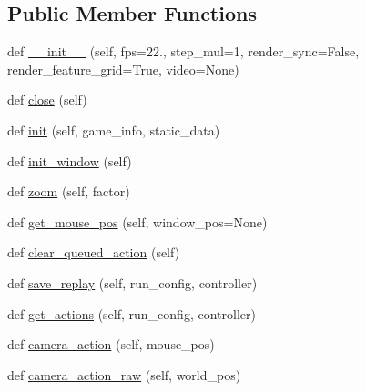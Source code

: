 \subsection*{Public Member Functions}
\begin{DoxyCompactItemize}
\item 
def \mbox{\hyperlink{classpysc2_1_1lib_1_1renderer__human_1_1_renderer_human_a26faecf964f718dda37529ab44187500}{\+\_\+\+\_\+init\+\_\+\+\_\+}} (self, fps=22., step\+\_\+mul=1, render\+\_\+sync=False, render\+\_\+feature\+\_\+grid=True, video=None)
\item 
def \mbox{\hyperlink{classpysc2_1_1lib_1_1renderer__human_1_1_renderer_human_abe6de0e7fa420c911d5ffe2ed32b8341}{close}} (self)
\item 
def \mbox{\hyperlink{classpysc2_1_1lib_1_1renderer__human_1_1_renderer_human_a5f454c5d09ca1ef6e270fd0b1823ac09}{init}} (self, game\+\_\+info, static\+\_\+data)
\item 
def \mbox{\hyperlink{classpysc2_1_1lib_1_1renderer__human_1_1_renderer_human_ab8c4fc4c1c501a62c5f13315c1d0268b}{init\+\_\+window}} (self)
\item 
def \mbox{\hyperlink{classpysc2_1_1lib_1_1renderer__human_1_1_renderer_human_ab34c77c2706bd142fb196a0da0e00a93}{zoom}} (self, factor)
\item 
def \mbox{\hyperlink{classpysc2_1_1lib_1_1renderer__human_1_1_renderer_human_a036b4ec57bccf6059f10d92bb3744b19}{get\+\_\+mouse\+\_\+pos}} (self, window\+\_\+pos=None)
\item 
def \mbox{\hyperlink{classpysc2_1_1lib_1_1renderer__human_1_1_renderer_human_aeb3f93dcb528183dafeb97d074674f5c}{clear\+\_\+queued\+\_\+action}} (self)
\item 
def \mbox{\hyperlink{classpysc2_1_1lib_1_1renderer__human_1_1_renderer_human_af7ca690aa563114ab576736a8d04b83a}{save\+\_\+replay}} (self, run\+\_\+config, controller)
\item 
def \mbox{\hyperlink{classpysc2_1_1lib_1_1renderer__human_1_1_renderer_human_a4b69f3cbb695f2cf639fe7f6e5547fb3}{get\+\_\+actions}} (self, run\+\_\+config, controller)
\item 
def \mbox{\hyperlink{classpysc2_1_1lib_1_1renderer__human_1_1_renderer_human_a8663ab4f864532fb35c3bafc92f9c14c}{camera\+\_\+action}} (self, mouse\+\_\+pos)
\item 
def \mbox{\hyperlink{classpysc2_1_1lib_1_1renderer__human_1_1_renderer_human_a5646d9167da16ca08f722b83cbf36151}{camera\+\_\+action\+\_\+raw}} (self, world\+\_\+pos)
\item 

\end{DoxyCompactItemize}
